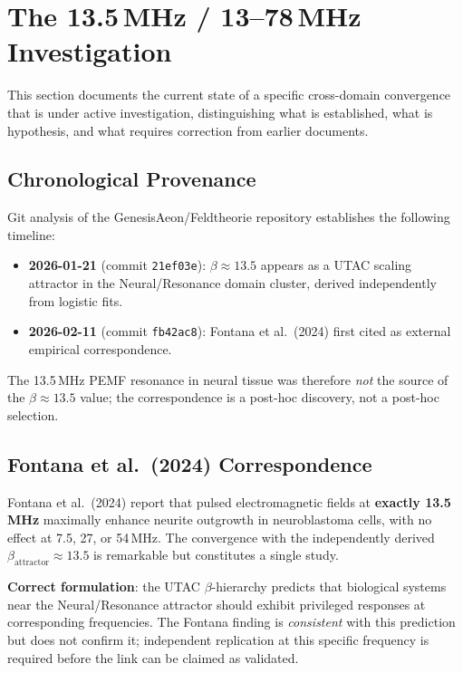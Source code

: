 \documentclass[12pt,a4paper]{article}
\theoremstyle{definition}
\begin{document}
\section{The 13.5\,MHz / 13--78\,MHz Investigation}

This section documents the current state of a specific cross-domain convergence
that is under active investigation, distinguishing what is established, what is
hypothesis, and what requires correction from earlier documents.

\subsection{Chronological Provenance}

\begin{validated}
Git analysis of the GenesisAeon/Feldtheorie repository establishes the following
timeline:
\begin{itemize}[leftmargin=1.8em]
  \item \textbf{2026-01-21} (commit \texttt{21ef03e}):
        $\beta \approx 13.5$ appears as a UTAC scaling attractor in the
        Neural/Resonance domain cluster, derived independently from logistic fits.
  \item \textbf{2026-02-11} (commit \texttt{fb42ac8}):
        Fontana et al.\ (2024) first cited as external empirical correspondence.
\end{itemize}
The 13.5\,MHz PEMF resonance in neural tissue was therefore \emph{not} the source
of the $\beta \approx 13.5$ value; the correspondence is a post-hoc discovery,
not a post-hoc selection.
\end{validated}

\subsection{Fontana et al.\ (2024) Correspondence}

\begin{hypothesis}
Fontana et al.\ (2024) report that pulsed electromagnetic fields at
\textbf{exactly 13.5\,MHz} maximally enhance neurite outgrowth in neuroblastoma
cells, with no effect at 7.5, 27, or 54\,MHz.
The convergence with the independently derived $\beta_{\mathrm{attractor}} \approx 13.5$
is remarkable but constitutes a single study.

\textbf{Correct formulation}: the UTAC $\beta$-hierarchy predicts that biological
systems near the Neural/Resonance attractor should exhibit privileged responses at
corresponding frequencies. The Fontana finding is \emph{consistent} with this
prediction but does not confirm it; independent replication at this specific
frequency is required before the link can be claimed as validated.
\end{hypothesis}
\end{document}
